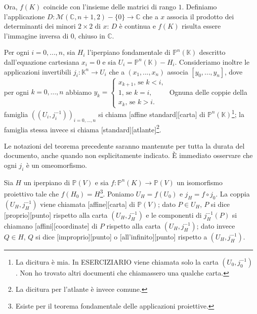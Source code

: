 	\par Ora, $f(K)$ coincide con l'insieme delle matrici di rango $1$. Definiamo l'applicazione $D: \mathcal{M}(\mathbb{C}, n + 1, 2) - \lbrace 0 \rbrace \rightarrow \mathbb{C}$ che a $x$ associa il prodotto dei determinanti dei minori $2 \times 2$ di $x$: $D$ \`e continua e $f(K)$ risulta essere l'immagine inversa di $0$, chiuso in $\mathbb{C}$. \EndProof
\begin{Definition}\label{deftop1}
	Per ogni $i = 0, ..., n$, sia $H_i$ l'iperpiano fondamentale di $\mathbb{P}^n(\mathbb{K})$ descritto dall'equazione cartesiana $x_i = 0$ e sia $U_i = \mathbb{P}^n(\mathbb{K}) - H_i$. Consideriamo inoltre le applicazioni invertibili $j_i: \mathbb{K}^n \rightarrow U_i$ che a $(x_1, ..., x_n)$ associa $[y_0, ..., y_n]$, dove per ogni $k = 0, ..., n$ abbiamo $y_k = \begin{cases} x_{k + 1}\text{, se } k < i,\\ 1\text{, se } k = i,\\ x_k \text{, se } k > i. \end{cases}$ Ognuna delle coppie della famiglia $((U_i, j_i^{-1}))_{i = 0, ..., n}$ si chiama [affine standard][carta] di $\mathbb{P}^n(\mathbb{K})$\footnote{La dicitura  \`e mia. In ESERCIZIARIO viene chiamata  solo la carta $(U_0, j_0^{-1})$. Non ho trovato altri documenti che chiamassero  una qualche carta.}; la famiglia stessa invece si chiama [standard][atlante]\footnote{La dicitura  per l'atlante \`e invece comune.}.
\end{Definition}
	\par Le notazioni del teorema precedente saranno mantenute per tutta la durata del documento, anche quando non esplicitamente indicato. \`E immediato osservare che ogni $j_i$ \`e un omeomorfismo.
\begin{Definition}\label{deftop2}
	Sia $H$ un iperpiano di $\mathbb{P}(V)$ e sia $f: \mathbb{P}^n(K) \rightarrow \mathbb{P}(V)$ un isomorfismo proiettivo tale che $f(H_0) = H$\footnote{Esiste per il teorema fondamentale delle applicazioni proiettive.}. Poniamo $U_H = f(U_0)$ e $j_H = f \circ j_0$. La coppia $(U_H,j_H^{-1})$ viene chiamata [affine][carta] di $\mathbb{P}(V)$; dato $P \in U_H$, $P$ si dice [proprio][punto] rispetto alla carta $(U_H, j_H^{-1})$ e le componenti di $j_H^{-1}(P)$ si chiamano [affini][coordinate] di $P$ rispetto alla carta $(U_H, j_H^{-1})$; dato invece $Q \in H$, $Q$ si dice [improprio][punto] o [all'infinito][punto] rispetto a $(U_H, j_H^{-1})$.
\end{Definition}
